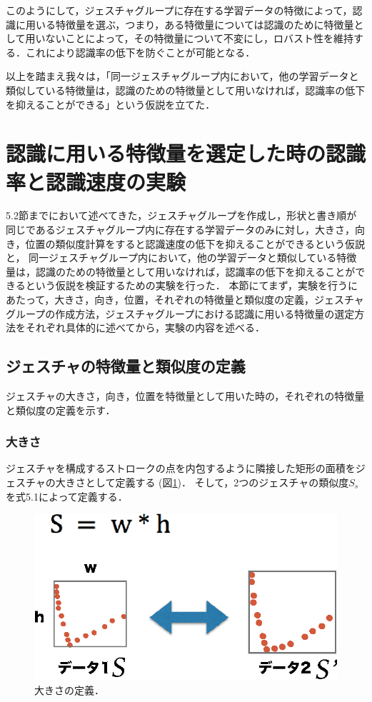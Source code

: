 このようにして，ジェスチャグループに存在する学習データの特徴によって，認識に用いる特徴量を選ぶ，つまり，ある特徴量については認識のために特徴量として用いないことによって，その特徴量について不変にし，ロバスト性を維持する．これにより認識率の低下を防ぐことが可能となる．

以上を踏まえ我々は，「同一ジェスチャグループ内において，他の学習データと類似している特徴量は，認識のための特徴量として用いなければ，認識率の低下を抑えることができる」という仮説を立てた．

\section{認識に用いる特徴量を選定した時の認識率と認識速度の実験}
5.2節までにおいて述べてきた，ジェスチャグループを作成し，形状と書き順が同じであるジェスチャグループ内に存在する学習データのみに対し，大きさ，向き，位置の類似度計算をすると認識速度の低下を抑えることができるという仮説と，
同一ジェスチャグループ内において，他の学習データと類似している特徴量は，認識のための特徴量として用いなければ，認識率の低下を抑えることができるという仮説を検証するための実験を行った．
本節にてまず，実験を行うにあたって，大きさ，向き，位置，それぞれの特徴量と類似度の定義，ジェスチャグループの作成方法，ジェスチャグループにおける認識に用いる特徴量の選定方法をそれぞれ具体的に述べてから，実験の内容を述べる．

\subsection{ジェスチャの特徴量と類似度の定義}
ジェスチャの大きさ，向き，位置を特徴量として用いた時の，それぞれの特徴量と類似度の定義を示す．

\subsubsection{大きさ}
ジェスチャを構成するストロークの点を内包するように隣接した矩形の面積をジェスチャの大きさとして定義する (図\ref{fig:v_size})．
そして，2つのジェスチャの類似度$S_\textit{s}$を式5.1によって定義する．

\begin{figure} [h!]
	\begin{center}
		\includegraphics [width=0.45\hsize ]{img/v_size.eps}
	\end{center}
	\caption{大きさの定義．}
	\label{fig:v_size}
\end{figure}

